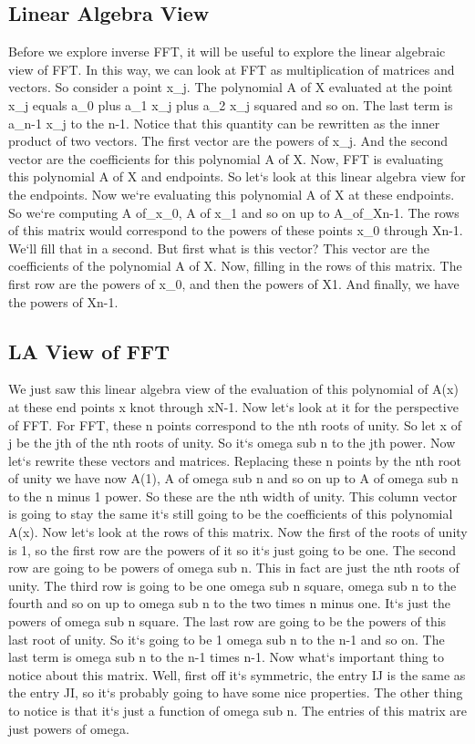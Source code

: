 \subsection{Linear Algebra View}
Before we explore inverse FFT, it will be useful to explore the linear algebraic view of FFT\@.
In this way, we can look at FFT as multiplication of matrices and vectors.
So consider a point x\_j.
The polynomial A of X evaluated at the point x\_j equals a\_0 plus a\_1 x\_j plus a\_2 x\_j squared and so on.
The last term is a\_n-1 x\_j to the n-1.
Notice that this quantity can be rewritten as the inner product of two vectors.
The first vector are the powers of x\_j.
And the second vector are the coefficients for this polynomial A of X\@.
Now, FFT is evaluating this polynomial A of X and endpoints.
So let`s look at this linear algebra view for the endpoints.
Now we`re evaluating this polynomial A of X at these endpoints.
So we`re computing A of\_x\_0, A of x\_1 and so on up to A\_of\_Xn-1.
The rows of this matrix would correspond to the powers of these points x\_0 through Xn-1.
We`ll fill that in a second.
But first what is this vector? This vector are the coefficients of the polynomial A of X\@.
Now, filling in the rows of this matrix.
The first row are the powers of x\_0, and then the powers of X1.
And finally, we have the powers of Xn-1.

\subsection{LA View of FFT}
We just saw this linear algebra view of the evaluation of this polynomial of A(x) at these end points x knot through xN-1.
Now let`s look at it for the perspective of FFT\@.
For FFT, these n points correspond to the nth roots of unity.
So let x of j be the jth of the nth roots of unity.
So it`s omega sub n to the jth power.
Now let`s rewrite these vectors and matrices.
Replacing these n points by the nth root of unity we have now A(1), A of omega sub n and so on up to A of omega sub n to the n minus 1 power.
So these are the nth width of unity.
This column vector is going to stay the same it`s still going to be the coefficients of this polynomial A(x).
Now let`s look at the rows of this matrix.
Now the first of the roots of unity is 1, so the first row are the powers of it so it`s just going to be one.
The second row are going to be powers of omega sub n.
This in fact are just the nth roots of unity.
The third row is going to be one omega sub n square, omega sub n to the fourth and so on up to omega sub n to the two times n minus one.
It`s just the powers of omega sub n square.
The last row are going to be the powers of this last root of unity.
So it`s going to be 1 omega sub n to the n-1 and so on.
The last term is omega sub n to the n-1 times n-1.
Now what`s important thing to notice about this matrix.
Well, first off it`s symmetric, the entry IJ is the same as the entry JI, so it`s probably going to have some nice properties.
The other thing to notice is that it`s just a function of omega sub n.
The entries of this matrix are just powers of omega.

